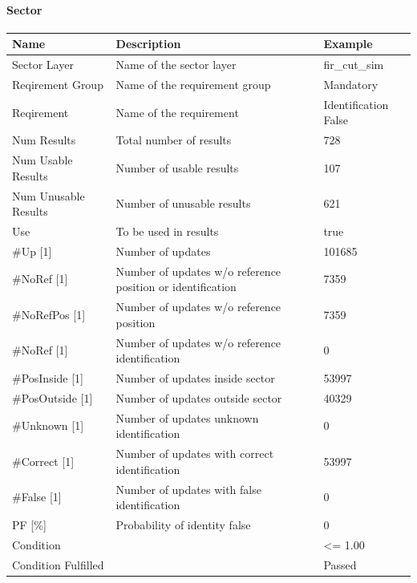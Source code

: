 \paragraph{Sector}

\begin{center}
 \begin{table}[H]
  \begin{tabularx}{\textwidth}{ | l | X |  l | }
    \hline
    \textbf{Name} & \textbf{Description} & \textbf{Example} \\ \hline
    Sector Layer & Name of the sector layer & fir\_cut\_sim \\ \hline
    Reqirement Group & Name of the requirement group & Mandatory \\ \hline
    Reqirement & Name of the requirement & Identification False \\ \hline
    Num Results & Total number of results & 728 \\ \hline
    Num Usable Results & Number of usable results & 107 \\ \hline
    Num Unusable Results & Number of unusable results & 621 \\ \hline
    Use & To be used in results & true \\ \hline
    \#Up [1] & Number of updates & 101685 \\ \hline
    \#NoRef [1] & Number of updates w/o reference position or identification & 7359 \\ \hline
    \#NoRefPos [1] & Number of updates w/o reference position  & 7359 \\ \hline
    \#NoRef [1] & Number of updates w/o reference identification & 0 \\ \hline
    \#PosInside [1] & Number of updates inside sector & 53997 \\ \hline
    \#PosOutside [1] & Number of updates outside sector & 40329 \\ \hline
    \#Unknown [1] & Number of updates unknown identification & 0 \\ \hline
    \#Correct [1] & Number of updates with correct identification & 53997 \\ \hline
    \#False [1] & Number of updates with false identification & 0 \\ \hline
    PF [\%] & Probability of identity false & 0 \\ \hline
    Condition &  & <= 1.00 \\ \hline
    Condition Fulfilled &  & Passed \\ \hline
\end{tabularx}
\end{table}
\end{center}

